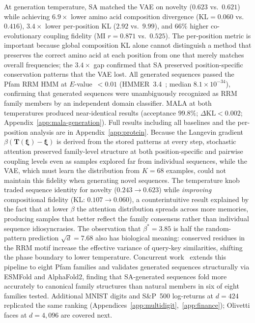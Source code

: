 At generation temperature, SA matched the VAE on novelty ($0.623$ vs.\ $0.621$) while achieving $6.9{\times}$ lower amino acid composition divergence (KL$=0.060$ vs.\ $0.416$), $3.4{\times}$ lower per-position KL ($2.92$ vs.\ $9.99$), and $66\%$ higher co-evolutionary coupling fidelity (MI $r{=}0.871$ vs.\ $0.525$). The per-position metric is important because global composition KL alone cannot distinguish a method that preserves the correct amino acid at each position from one that merely matches overall frequencies; the $3.4{\times}$ gap confirmed that SA preserved position-specific conservation patterns that the VAE lost. All generated sequences passed the Pfam RRM HMM at $E$-value~$<0.01$ (HMMER~3.4~\cite{hmmer3}; median $8.1{\times}10^{-34}$), confirming that generated sequences were unambiguously recognized as RRM family members by an independent domain classifier. MALA at both temperatures produced near-identical results (acceptance $99.8\%$; $\Delta\mathrm{KL}<0.002$; Appendix~\ref{app:mala-generation}). Full results including all baselines and the per-position analysis are in Appendix~\ref{app:protein}. Because the Langevin gradient $\beta(\mathbf{T}(\boldsymbol{\xi})-\boldsymbol{\xi})$ is derived from the stored patterns at every step, stochastic attention preserved family-level structure at both position-specific and pairwise coupling levels even as samples explored far from individual sequences, while the VAE, which must learn the distribution from $K{=}68$ examples, could not maintain this fidelity when generating novel sequences. The temperature knob traded sequence identity for novelty ($0.243\to 0.623$) while \emph{improving} compositional fidelity (KL: $0.107\to 0.060$), a counterintuitive result explained by the fact that at lower $\beta$ the attention distribution spreads across more memories, producing samples that better reflect the family consensus rather than individual sequence idiosyncrasies. The observation that $\beta^*{=}3.85$ is half the random-pattern prediction $\sqrt{d}{=}7.68$ also has biological meaning: conserved residues in the RRM motif increase the effective variance of query-key similarities, shifting the phase boundary to lower temperature. Concurrent work~\cite{varnerTrainingFreeProtein2026} extends this pipeline to eight Pfam families and validates generated sequences structurally via ESMFold and AlphaFold2, finding that SA-generated sequences fold more accurately to canonical family structures than natural members in six of eight families tested. Additional MNIST digits and S\&P~500 log-returns at $d{=}424$ replicated the same ranking (Appendices~\ref{app:multidigit},~\ref{app:finance}); Olivetti faces at $d{=}4{,}096$ are covered next.

